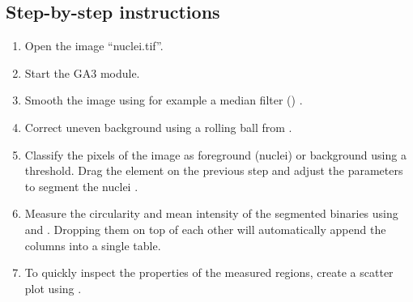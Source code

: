 \subsection*{Step-by-step instructions}
\begin{enumerate}
    \item Open the image ``nuclei.tif''.
    \item Start the GA3 module.
    \item Smooth the image using for example a median filter () .
    \item Correct uneven background using a rolling ball from  .
    \item Classify the pixels of the image as foreground (nuclei) or background using a threshold. Drag the element  on the previous step and adjust the parameters to segment the nuclei .
    \item Measure the circularity and mean intensity of the segmented binaries using  and  . Dropping them on top of each other will automatically append the columns into a single table.
    \item To quickly inspect the properties of the measured regions, create a scatter plot using .
\end{enumerate}

